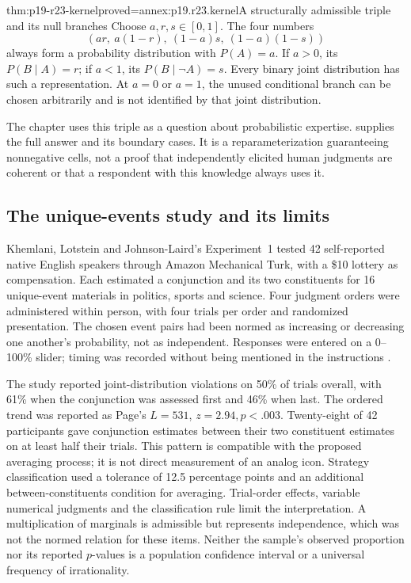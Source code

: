 \begin{hbtheorem}{thm:p19-r23-kernel}{proved=annex:p19.r23.kernel}{A structurally admissible triple and its null branches}
Choose \(a,r,s\in[0,1]\). The four numbers
\[
 (ar,\ a(1-r),\ (1-a)s,\ (1-a)(1-s))
\]
always form a probability distribution with \(P(A)=a\). If \(a>0\),
its \(P(B\mid A)=r\); if \(a<1\), its
\(P(B\mid\neg A)=s\). Every binary joint distribution has such a
representation. At \(a=0\) or \(a=1\), the unused conditional branch
can be chosen arbitrarily and is not identified by that joint distribution.
\end{hbtheorem}

The chapter uses this triple as a question about probabilistic expertise.
 supplies the full answer and its boundary cases.
It is a reparameterization guaranteeing nonnegative cells, not a proof
that independently elicited human judgments are coherent or that a
respondent with this knowledge always uses it.

\subsection{The unique-events study and its limits}

Khemlani, Lotstein and Johnson-Laird's Experiment~1 tested 42 self-reported
native English speakers through Amazon Mechanical Turk, with a \$10
lottery as compensation. Each estimated a conjunction and its two
constituents for 16 unique-event materials in politics, sports and science.
Four judgment orders were administered within person, with four trials
per order and randomized presentation. The chosen event pairs had been
normed as increasing or decreasing one another's probability, not as
independent. Responses were entered on a 0--100\% slider; timing was
recorded without being mentioned in the instructions
\cite[early-view pp.~19--22]{KhemlaniLotsteinJohnsonLaird2015Naive}.

The study reported joint-distribution violations on 50\% of trials
overall, with 61\% when the conjunction was assessed first and 46\%
when last. The ordered trend was reported as Page's \(L=531\),
\(z=2.94,p<.003\). Twenty-eight of 42 participants gave conjunction
estimates between their two constituent estimates on at least half their
trials. This pattern is compatible with the proposed averaging process;
it is not direct measurement of an analog icon. Strategy classification
used a tolerance of 12.5 percentage points and an additional
between-constituents condition for averaging. Trial-order effects,
variable numerical judgments and the classification rule limit the
interpretation. A multiplication of marginals is admissible but represents
independence, which was not the normed relation for these items. Neither
the sample's observed proportion nor its reported \(p\)-values is a
population confidence interval or a universal frequency of irrationality.

